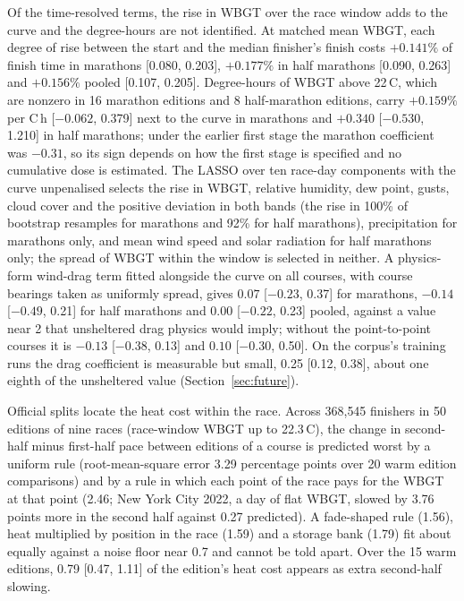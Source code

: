 \documentclass[11pt]{article}
\renewcommand{\_}{\textunderscore\allowbreak}
\begin{document}
Of the time-resolved terms, the rise in WBGT over the race window adds to the curve and the degree-hours are not identified. At matched mean WBGT, each degree of rise between the start and the median finisher's finish costs $+0.141\%$ of finish time in marathons [0.080, 0.203], $+0.177\%$ in half marathons [0.090, 0.263] and $+0.156\%$ pooled [0.107, 0.205]. Degree-hours of WBGT above 22\,\textdegree C, which are nonzero in 16 marathon editions and 8 half-marathon editions, carry $+0.159\%$ per \textdegree C\,h [$-0.062$, 0.379] next to the curve in marathons and $+0.340$ [$-0.530$, 1.210] in half marathons; under the earlier first stage the marathon coefficient was $-0.31$, so its sign depends on how the first stage is specified and no cumulative dose is estimated. The LASSO over ten race-day components with the curve unpenalised selects the rise in WBGT, relative humidity, dew point, gusts, cloud cover and the positive deviation in both bands (the rise in 100\% of bootstrap resamples for marathons and 92\% for half marathons), precipitation for marathons only, and mean wind speed and solar radiation for half marathons only; the spread of WBGT within the window is selected in neither. A physics-form wind-drag term fitted alongside the curve on all courses, with course bearings taken as uniformly spread, gives $0.07$ [$-0.23$, 0.37] for marathons, $-0.14$ [$-0.49$, 0.21] for half marathons and $0.00$ [$-0.22$, 0.23] pooled, against a value near 2 that unsheltered drag physics would imply; without the point-to-point courses it is $-0.13$ [$-0.38$, 0.13] and $0.10$ [$-0.30$, 0.50]. On the corpus's training runs the drag coefficient is measurable but small, 0.25 [0.12, 0.38], about one eighth of the unsheltered value (Section~\ref{sec:future}).

Official splits locate the heat cost within the race. Across 368{,}545 finishers in 50 editions of nine races (race-window WBGT up to 22.3\,\textdegree C), the change in second-half minus first-half pace between editions of a course is predicted worst by a uniform rule (root-mean-square error 3.29 percentage points over 20 warm edition comparisons) and by a rule in which each point of the race pays for the WBGT at that point (2.46; New York City 2022, a day of flat WBGT, slowed by 3.76 points more in the second half against 0.27 predicted). A fade-shaped rule (1.56), heat multiplied by position in the race (1.59) and a storage bank (1.79) fit about equally against a noise floor near 0.7 and cannot be told apart. Over the 15 warm editions, 0.79 [0.47, 1.11] of the edition's heat cost appears as extra second-half slowing.
\end{document}
